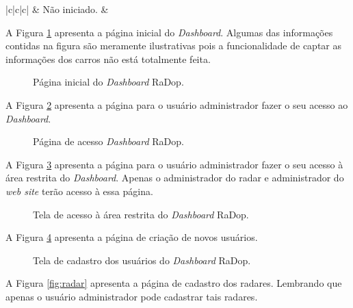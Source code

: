 \begin{table}[H]
{\begin{tabular}{|c|c|c|}
 & Não iniciado. &  \\ \hline
\end{tabular}%
}
\end{table}


A Figura \ref{fig:home} apresenta a página inicial do \textit{Dashboard}. Algumas das informações contidas na figura são meramente ilustrativas pois a funcionalidade de captar as informações dos carros não está totalmente feita.

\begin{figure}[H]
	\caption{\label{fig:home} Página inicial do \textit{Dashboard} RaDop.}
\end{figure}

A Figura \ref{fig:login} apresenta a página para o usuário administrador fazer o seu acesso ao \textit{Dashboard}. 

\begin{figure}[H]
	\caption{\label{fig:login} Página de acesso \textit{Dashboard} RaDop.}
\end{figure}

A Figura \ref{fig:loginadmin} apresenta a página para o usuário administrador fazer o seu acesso à área restrita do \textit{Dashboard}. Apenas o administrador do radar e administrador do \textit{web site} terão acesso à essa página. 

\begin{figure}[H]
	\caption{\label{fig:loginadmin} Tela de acesso à área restrita do \textit{Dashboard} RaDop.}
\end{figure}

A Figura \ref{fig:user} apresenta a página de criação de novos usuários.

\begin{figure}[H]
	\caption{\label{fig:user} Tela de cadastro dos usuários do \textit{Dashboard} RaDop.}
\end{figure}

A Figura \ref{fig:radar} apresenta a página de cadastro dos radares. Lembrando que apenas o usuário administrador pode cadastrar tais radares.

